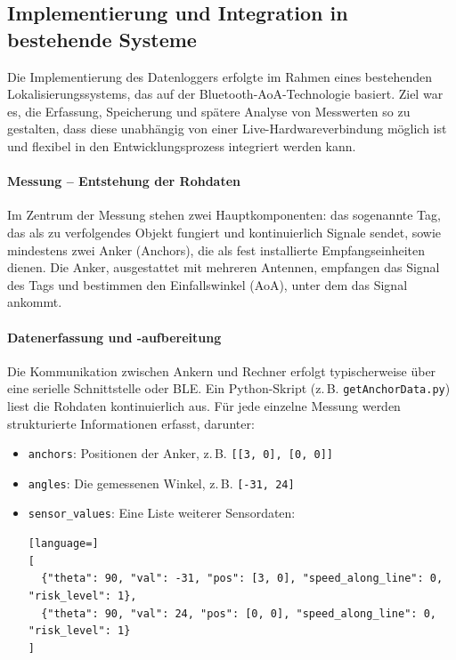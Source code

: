 \documentclass[a4paper, 12pt]{article} %
\begin{document}
\subsection{Implementierung und Integration in bestehende Systeme}

Die Implementierung des Datenloggers erfolgte im Rahmen eines bestehenden Lokalisierungssystems, das auf der Bluetooth-\ac{AoA}-Technologie 
basiert. Ziel war es, die Erfassung, Speicherung und spätere Analyse von Messwerten so zu gestalten, dass diese unabhängig
von einer Live-Hardwareverbindung möglich ist und flexibel in den Entwicklungsprozess integriert werden kann.

\paragraph{Messung – Entstehung der Rohdaten}

Im Zentrum der Messung stehen zwei Hauptkomponenten: das sogenannte Tag, das als zu verfolgendes Objekt fungiert 
und kontinuierlich Signale sendet, sowie mindestens zwei Anker (Anchors), die als fest installierte Empfangseinheiten dienen. 
Die Anker, ausgestattet mit mehreren Antennen, empfangen das Signal des Tags und bestimmen den Einfallswinkel (\ac{AoA}), unter dem 
das Signal ankommt. 

\paragraph{Datenerfassung und -aufbereitung}

Die Kommunikation zwischen Ankern und Rechner erfolgt typischerweise über eine serielle Schnittstelle oder \ac{BLE}. 
Ein Python-Skript (z.\,B. \texttt{getAnchorData.py}) liest die Rohdaten kontinuierlich aus. Für jede einzelne Messung werden strukturierte Informationen
erfasst, darunter:

\begin{itemize}
    \item \texttt{anchors}: Positionen der Anker, z.\,B. \texttt{[[3, 0], [0, 0]]}
    \item \texttt{angles}: Die gemessenen Winkel, z.\,B. \texttt{[-31, 24]}
    \item \texttt{sensor\_values}: Eine Liste weiterer Sensordaten:
\begin{lstlisting}[language=]
[
  {"theta": 90, "val": -31, "pos": [3, 0], "speed_along_line": 0, "risk_level": 1},
  {"theta": 90, "val": 24, "pos": [0, 0], "speed_along_line": 0, "risk_level": 1}
]
\end{lstlisting}
\end{itemize}
\end{document}
